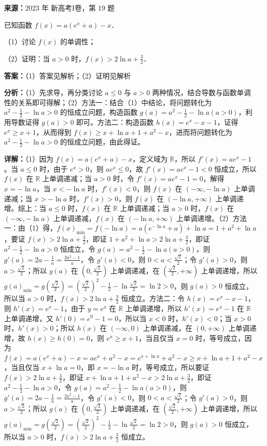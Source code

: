 \begin{question}[points=12]
\textbf{来源：}2023 年 新高考I卷，第 19 题\par
已知函数 $f(x)=a(e^x+a)-x$．

（1）讨论 $f(x)$ 的单调性；

（2）证明：当 $a>0$ 时，$f(x)>2\ln a+\frac{3}{2}$．
\begin{solution}
\textbf{答案：}（1）答案见解析；（2）证明见解析

\textbf{分析：}（1）先求导，再分类讨论 $a\leq 0$ 与 $a>0$ 两种情况，结合导数与函数单调性的关系即可得解；（2）方法一：结合（1）中结论，将问题转化为 $a^2-\frac{1}{2}-\ln a>0$ 的恒成立问题，构造函数 $g(a)=a^2-\frac{1}{2}-\ln a(a>0)$，利用导数证得 $g(a)>0$ 即可。方法二：构造函数 $h(x)=e^x-x-1$，证得 $e^x\geq x+1$，从而得到 $f(x)\geq x+\ln a+1+a^2-x$，进而将问题转化为 $a^2-\frac{1}{2}-\ln a>0$ 的恒成立问题，由此得证。

\textbf{详解：}（1）因为 $f(x)=a(e^x+a)-x$，定义域为 $\mathbb{R}$，所以 $f'(x)=ae^x-1$。当 $a\leq 0$ 时，由于 $e^x>0$，则 $ae^x\leq 0$，故 $f'(x)=ae^x-1<0$ 恒成立，所以 $f(x)$ 在 $\mathbb{R}$ 上单调递减；当 $a>0$ 时，令 $f'(x)=ae^x-1=0$，解得 $x=-\ln a$，当 $x<-\ln a$ 时，$f'(x)<0$，则 $f(x)$ 在 $(-\infty,-\ln a)$ 上单调递减；当 $x>-\ln a$ 时，$f'(x)>0$，则 $f(x)$ 在 $(-\ln a,+\infty)$ 上单调递增。综上：当 $a\leq 0$ 时，$f(x)$ 在 $\mathbb{R}$ 上单调递减；当 $a>0$ 时，$f(x)$ 在 $(-\infty,-\ln a)$ 上单调递减，$f(x)$ 在 $(-\ln a,+\infty)$ 上单调递增。（2）方法一：由（1）得，$f(x)_{\min}=f(-\ln a)=a(e^{-\ln a}+a)+\ln a=1+a^2+\ln a$，要证 $f(x)>2\ln a+\frac{3}{2}$，即证 $1+a^2+\ln a>2\ln a+\frac{3}{2}$，即证 $a^2-\frac{1}{2}-\ln a>0$ 恒成立，令 $g(a)=a^2-\frac{1}{2}-\ln a(a>0)$，则 $g'(a)=2a-\frac{1}{a}=\frac{2a^2-1}{a}$，令 $g'(a)<0$，则 $0<a<\frac{\sqrt{2}}{2}$；令 $g'(a)>0$，则 $a>\frac{\sqrt{2}}{2}$；所以 $g(a)$ 在 $(0,\frac{\sqrt{2}}{2})$ 上单调递减，在 $(\frac{\sqrt{2}}{2},+\infty)$ 上单调递增，所以 $g(a)_{\min}=g(\frac{\sqrt{2}}{2})=(\frac{\sqrt{2}}{2})^2-\frac{1}{2}-\ln\frac{\sqrt{2}}{2}=\ln2>0$，则 $g(a)>0$ 恒成立，所以当 $a>0$ 时，$f(x)>2\ln a+\frac{3}{2}$ 恒成立。方法二：令 $h(x)=e^x-x-1$，则 $h'(x)=e^x-1$，由于 $y=e^x$ 在 $\mathbb{R}$ 上单调递增，所以 $h'(x)=e^x-1$ 在 $\mathbb{R}$ 上单调递增，又 $h'(0)=e^0-1=0$，所以当 $x<0$ 时，$h'(x)<0$；当 $x>0$ 时，$h'(x)>0$；所以 $h(x)$ 在 $(-\infty,0)$ 上单调递减，在 $(0,+\infty)$ 上单调递增，故 $h(x)\geq h(0)=0$，则 $e^x\geq x+1$，当且仅当 $x=0$ 时，等号成立，因为 $f(x)=a(e^x+a)-x=ae^x+a^2-x=e^{x+\ln a}+a^2-x\geq x+\ln a+1+a^2-x$，当且仅当 $x+\ln a=0$，即 $x=-\ln a$ 时，等号成立，所以要证 $f(x)>2\ln a+\frac{3}{2}$，即证 $x+\ln a+1+a^2-x>2\ln a+\frac{3}{2}$，即证 $a^2-\frac{1}{2}-\ln a>0$，令 $g(a)=a^2-\frac{1}{2}-\ln a(a>0)$，则 $g'(a)=2a-\frac{1}{a}=\frac{2a^2-1}{a}$，令 $g'(a)<0$，则 $0<a<\frac{\sqrt{2}}{2}$；令 $g'(a)>0$，则 $a>\frac{\sqrt{2}}{2}$；所以 $g(a)$ 在 $(0,\frac{\sqrt{2}}{2})$ 上单调递减，在 $(\frac{\sqrt{2}}{2},+\infty)$ 上单调递增，所以 $g(a)_{\min}=g(\frac{\sqrt{2}}{2})=(\frac{\sqrt{2}}{2})^2-\frac{1}{2}-\ln\frac{\sqrt{2}}{2}=\ln2>0$，则 $g(a)>0$ 恒成立，所以当 $a>0$ 时，$f(x)>2\ln a+\frac{3}{2}$ 恒成立。
\end{solution}
\end{question}

